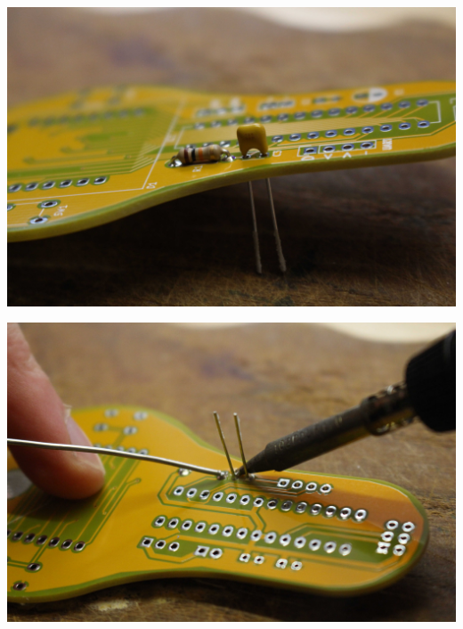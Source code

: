 \documentclass{article}
\begin{document}
\begin{minipage}[b]{0.5\textwidth}
	\includegraphics[width=\textwidth]{Bilder/IMG_5548.JPG}
\end{minipage}
\begin{minipage}[b]{0.5\textwidth}
	\includegraphics[width=\textwidth]{Bilder/IMG_5550.JPG}
\end{minipage}

\vspace{0.5cm}
\end{document}
